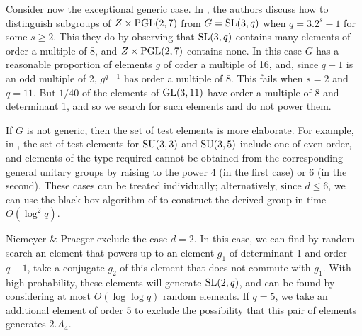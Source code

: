 \documentclass[12pt]{article}
\def\SL{{\rm SL}}
\def\GL{{\rm GL}}
\def\SU{{\rm SU}}
\def\SX{{\rm SX}}
\def\PGL{{\rm PGL}}
\begin{document}

Consider now the exceptional generic case.
In \cite[Case 1, p.\ 159]{NP}, the authors discuss how
to distinguish subgroups of $Z\times \PGL(2,7)$ from 
$G = \SL(3,q)$ when $q=3.2^s-1$ for some $s\ge2$.  This they do by observing that
$\SL(3,q)$ contains many elements of order a multiple of 8, and 
$Z\times\PGL(2,7)$ contains none.  
In this case $G$ has a reasonable proportion of 
elements $g$ of order a multiple of 16, and, since $q - 1$
is an odd multiple of 2, $g^{q - 1}$ has order a multiple of 8.
This fails when $s = 2$ and $q = 11$.
But $1/40$ of the elements of $\GL(3, 11)$ have order a 
multiple of 8 and determinant 1, and so we search for such 
elements and do not power them.

If $G$ is not generic, then 
the set of test elements is more elaborate.
For example, in \cite[Table 8, p.\ 248]{JAMS},
the set of test elements for $\SU(3,3)$ and $\SU(3,5)$ include one
of even order, and elements of the type required cannot be obtained from 
the corresponding general unitary groups by raising to the power 
4 (in the first case) or 6 (in the second).  
These cases can be treated individually; alternatively, since $d \leq 6$, we
can use the black-box algorithm of \cite[Theorem 2.4.8]{Seress03}
to construct the derived group in time $O(\log^2 q)$.

Niemeyer \& Praeger \cite{NP} exclude the case $d=2$.  In this case, we can find by 
random search an element that powers up to an element $g_1$ of determinant 1
and order $q+1$, take a conjugate $g_2$ of this element that does not
commute with $g_1$.  With high probability, these elements will generate $\SL(2,q)$, 
and can be found by considering at most $O(\log \log q)$ random elements.
If $q=5$, we take an additional element of order 5 to exclude the 
possibility that this pair of elements generates $2.A_4$.
\end{document}
